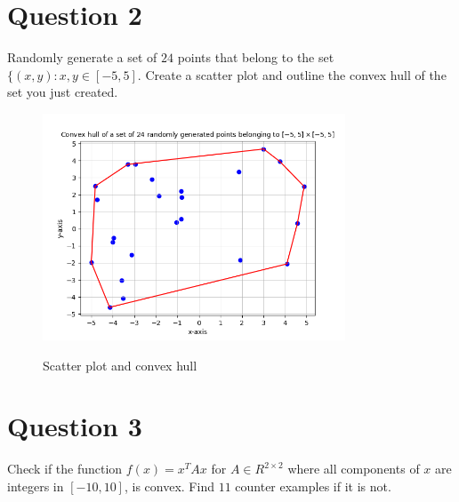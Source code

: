 \documentclass{article}
\begin{document}
\begin{flushleft}
\section{Question 2}
Randomly generate a set of $24$ points that belong to the set $\{(x,y):x,y\in[-5,5]$. Create a scatter plot and outline the convex hull of the set you just created.
\begin{figure}[htp]
        \centering
        \includegraphics[width=9cm]{conv_hull.png}\\
        \caption{Scatter plot and convex hull}
\end{figure}
\section{Question 3}
Check if the function $f(x)=x^{T}Ax$ for $A\in R^{2\times2}$ where all components of $x$ are integers in $[-10,10]$, is convex. Find $11$ counter examples if it is not.\\~\\


\end{flushleft}
\end{document}
